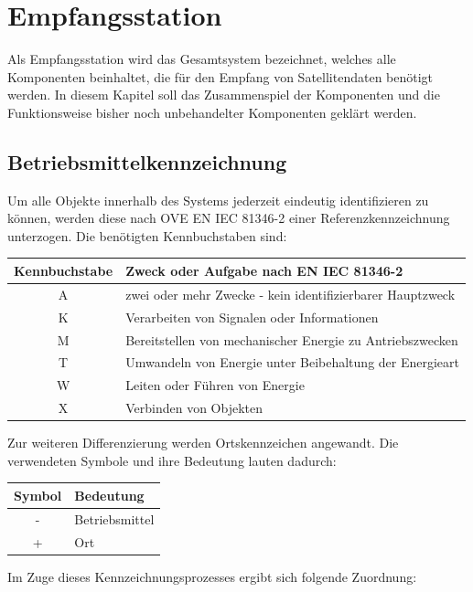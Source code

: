 \chapter{Empfangsstation}
Als Empfangsstation wird das Gesamtsystem bezeichnet, welches alle Komponenten beinhaltet, die für den Empfang von Satellitendaten benötigt werden. In diesem Kapitel soll das Zusammenspiel der Komponenten und die Funktionsweise bisher noch unbehandelter Komponenten geklärt werden.

\section{Betriebsmittelkennzeichnung}
\label{sec:bmk}
Um alle Objekte innerhalb des Systems jederzeit eindeutig identifizieren zu können, werden diese nach OVE EN IEC 81346-2 einer Referenzkennzeichnung unterzogen. Die benötigten Kennbuchstaben sind:

\begin{tabular}{|c|l|}
	\hline
	\textbf{Kennbuchstabe} & \textbf{Zweck oder Aufgabe nach EN IEC 81346-2} \\
	\hline
	A & zwei oder mehr Zwecke - kein identifizierbarer Hauptzweck \\
	\hline
	K & Verarbeiten von Signalen oder Informationen \\
	\hline
	M & Bereitstellen von mechanischer Energie zu Antriebszwecken \\
	\hline
	T & Umwandeln von Energie unter Beibehaltung der Energieart \\
	\hline
	W & Leiten oder Führen von Energie \\
	\hline
	X & Verbinden von Objekten \\
	\hline
\end{tabular}

Zur weiteren Differenzierung werden Ortskennzeichen angewandt. Die verwendeten Symbole und ihre Bedeutung lauten dadurch:

\begin{tabular}{|c|l|}
	\hline
	\textbf{Symbol} & \textbf{Bedeutung} \\
	\hline
	- & Betriebsmittel \\
	\hline
	+ & Ort \\
	\hline
\end{tabular}

Im Zuge dieses Kennzeichnungsprozesses ergibt sich folgende Zuordnung:

